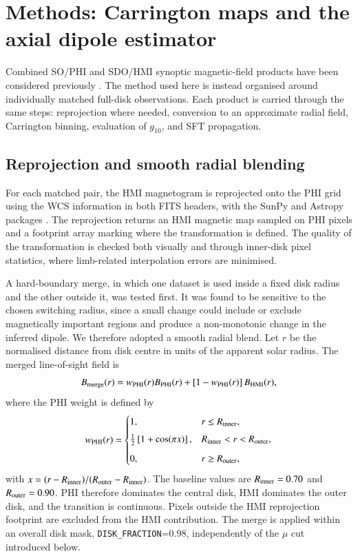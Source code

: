 \documentclass{aa}
\begin{document}
\section{Methods: Carrington maps and the axial dipole estimator}
\label{sec:methods}

Combined SO/PHI and SDO/HMI synoptic magnetic-field products have been considered previously \citep{Loeschl2024a,Loeschl2024b}. The method used here is instead organised around individually matched full-disk observations. Each product is carried through the same steps: reprojection where needed, conversion to an approximate radial field, Carrington binning, evaluation of $g_{10}$, and SFT propagation.

\subsection{Reprojection and smooth radial blending}
\label{sec:methods-merge}

For each matched pair, the HMI magnetogram is reprojected onto the PHI grid using the WCS information in both FITS headers, with the SunPy and Astropy packages \citep{SunPy2020,Astropy2018}. The reprojection returns an HMI magnetic map sampled on PHI pixels and a footprint array marking where the transformation is defined. The quality of the transformation is checked both visually and through inner-disk pixel statistics, where limb-related interpolation errors are minimised.

A hard-boundary merge, in which one dataset is used inside a fixed disk radius and the other outside it, was tested first. It was found to be sensitive to the chosen switching radius, since a small change could include or exclude magnetically important regions and produce a non-monotonic change in the inferred dipole. We therefore adopted a smooth radial blend. Let $r$ be the normalised distance from disk centre in units of the apparent solar radius. The merged line-of-sight field is
\begin{equation}
    B_{\rm merge}(r) = w_{\rm PHI}(r) B_{\rm PHI}(r) + \left[1-w_{\rm PHI}(r)\right] B_{\rm HMI}(r),
    \label{eq:blend}
\end{equation}
where the PHI weight is defined by
\begin{equation}
    w_{\rm PHI}(r) =
    \begin{cases}
        1, & r \le R_{\rm inner}, \\[4pt]
        \frac{1}{2}\left[1+\cos(\pi x)\right], & R_{\rm inner}<r<R_{\rm outer}, \\[6pt]
        0, & r \ge R_{\rm outer},
    \end{cases}
    \label{eq:weight}
\end{equation}
with $x=(r-R_{\rm inner})/(R_{\rm outer}-R_{\rm inner})$. The baseline values are $R_{\rm inner}=0.70$ and $R_{\rm outer}=0.90$. PHI therefore dominates the central disk, HMI dominates the outer disk, and the transition is continuous. Pixels outside the HMI reprojection footprint are excluded from the HMI contribution. The merge is applied within an overall disk mask, \texttt{DISK\_FRACTION}=0.98, independently of the $\mu$ cut introduced below.
\end{document}
